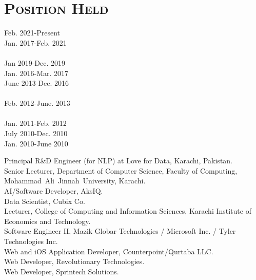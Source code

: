 \documentclass[a4paper, 10pt]{article}
\begin{document}
\section*{\normalfont\textsc{Position Held}}
\hfill\begin{minipage}{0.23\textwidth}
Feb. 2021-Present\textcolor{lightgray}{\dotfill}\\
Jan. 2017-Feb. 2021\textcolor{lightgray}{\dotfill}\\\\
Jan 2019-Dec. 2019\textcolor{lightgray}{\dotfill}\\
Jan. 2016-Mar. 2017\textcolor{lightgray}{\dotfill}\\
June 2013-Dec. 2016\textcolor{lightgray}{\dotfill}\\\\
Feb. 2012-June. 2013\textcolor{lightgray}{\dotfill}\\\\
Jan. 2011-Feb. 2012\textcolor{lightgray}{\dotfill}\\
July 2010-Dec. 2010\textcolor{lightgray}{\dotfill}\\
Jan. 2010-June 2010\textcolor{lightgray}{\dotfill}\\
\end{minipage}
\begin{minipage}{0.74\textwidth}
Principal R\&D Engineer (for NLP) at Love for Data, Karachi, Pakistan.\\
Senior Lecturer, Department of Computer Science, Faculty of Computing, Mohammad~Ali~Jinnah~University, Karachi.\\
AI/Software Developer, AksIQ.\\
Data Scientist, Cubix Co.\\
Lecturer, College of Computing and Information Sciences, Karachi Institute of Economics and Technology.\\
Software Engineer II, Mazik Globar Technologies / Microsoft Inc. / Tyler Technologies Inc.\\
Web and iOS Application Developer, Counterpoint/Qurtaba LLC.\\
Web Developer, Revolutionary Technologies.\\
Web Developer, Sprintech Solutions.\\
\end{minipage}



\end{document}
